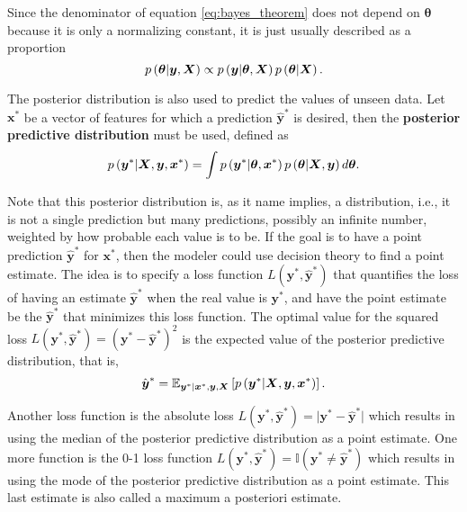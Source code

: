 Since the denominator of equation \eqref{eq:bayes_theorem} does not depend on $\boldsymbol{\theta}$ because it is only a normalizing constant, it is just usually described as a proportion
\begin{equation}
  \label{eq:bayes_theorem_prop}
    p\left( \boldsymbol{\theta} | \boldsymbol{y}, \boldsymbol{X} \right) \propto p\left( \boldsymbol{y} | \boldsymbol{\theta}, \boldsymbol{X} \right) p\left( \boldsymbol{\theta} | \boldsymbol{X} \right).
\end{equation}

The posterior distribution is also used to predict the values of unseen data. Let $\boldsymbol{x}^*$ be a vector of features for which a prediction $\hat{\boldsymbol{y}}^*$ is desired, then the \textbf{posterior predictive distribution} must be used, defined as
\begin{equation}
  \label{eq:post_pred_dist}
  p\left( \boldsymbol{y}^* | \boldsymbol{X}, \boldsymbol{y}, \boldsymbol{x}^* \right) = \int p\left( \boldsymbol{y}^* | \boldsymbol{\theta}, \boldsymbol{x}^* \right) p\left( \boldsymbol{\theta} | \boldsymbol{X}, \boldsymbol{y} \right) d\boldsymbol{\theta}.
\end{equation}

Note that this posterior distribution is, as it name implies, a distribution, i.e., it is not a single prediction but many predictions, possibly an infinite number, weighted by how probable each value is to be. If the goal is to have a point prediction $\hat{\boldsymbol{y}}^*$ for $\boldsymbol{x}^*$, then the modeler could use decision theory to find a point estimate. The idea is to specify a loss function $L(\boldsymbol{y}^*, \hat{\boldsymbol{y}}^*)$ that quantifies the loss of having an estimate $\hat{\boldsymbol{y}}^*$ when the real value is $\boldsymbol{y}^*$, and have the point estimate be the $\hat{\boldsymbol{y}}^*$ that minimizes this loss function. The optimal value for the squared loss $L(\boldsymbol{y}^*, \hat{\boldsymbol{y}}^*) = (\boldsymbol{y}^* - \hat{\boldsymbol{y}}^*)^2$ is the expected value of the posterior predictive distribution, that is,
\begin{equation}
  \hat{\boldsymbol{y}}^* = \mathbb{E}_{\boldsymbol{y}^* | \boldsymbol{x}^*, \boldsymbol{y}, \boldsymbol{X}} \left[ p\left( \boldsymbol{y}^* | \boldsymbol{X}, \boldsymbol{y}, \boldsymbol{x}^* \right) \right].
\end{equation}

Another loss function is the absolute loss $L(\boldsymbol{y}^*, \hat{\boldsymbol{y}}^*) = \vert \boldsymbol{y}^* - \hat{\boldsymbol{y}}^* \vert$ which results in using the median of the posterior predictive distribution as a point estimate. One more function is the 0-1 loss function $L(\boldsymbol{y}^*, \hat{\boldsymbol{y}}^*) = \mathbb{I}(\boldsymbol{y}^* \neq \hat{\boldsymbol{y}}^* )$ which results in using the mode of the posterior predictive distribution as a point estimate. This last estimate is also called a maximum a posteriori estimate.

